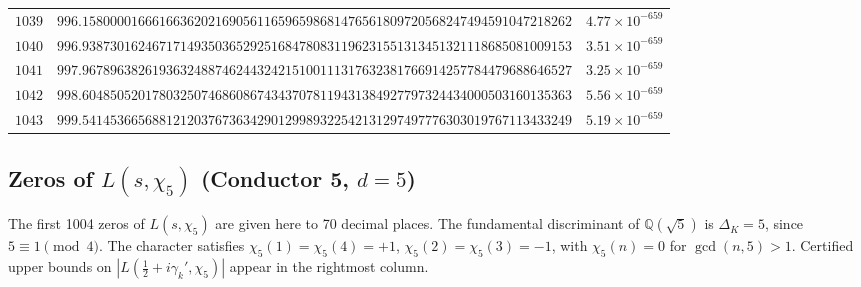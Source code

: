 \documentclass[12pt,reqno]{amsart}
\theoremstyle{remark}
\newcommand{\Q}{\mathbb{Q}}
\begin{document}
\begin{longtable}{clc}
$1039$ & $996.1580000166616636202169056116596598681476561809720568247494591047218262$ & $4.77\times 10^{-659}$ \\
$1040$ & $996.9387301624671714935036529251684780831196231551313451321118685081009153$ & $3.51\times 10^{-659}$ \\
$1041$ & $997.9678963826193632488746244324215100111317632381766914257784479688646527$ & $3.25\times 10^{-659}$ \\
$1042$ & $998.6048505201780325074686086743437078119431384927797324434000503160135363$ & $5.56\times 10^{-659}$ \\
$1043$ & $999.5414536656881212037673634290129989322542131297497776303019767113433249$ & $5.19\times 10^{-659}$ \\
\end{longtable}
\normalsize
\setlength{\LTleft}{0pt}
\setlength{\LTright}{0pt}

\subsection{Zeros of \texorpdfstring{$L(s,\chi_5)$}{L(s,chi5)} (Conductor 5, \texorpdfstring{$d = 5$}{d=5})}
\label{subsec:chi5}

The first 1004 zeros of $L(s,\chi_5)$ are given here to 70 decimal places.  The fundamental discriminant of $\Q(\sqrt{5})$ is $\Delta_K = 5$, since $5 \equiv 1 \pmod{4}$.  The character satisfies $\chi_5(1) = \chi_5(4) = +1$, $\chi_5(2) = \chi_5(3) = -1$, with $\chi_5(n) = 0$ for $\gcd(n,5) > 1$.  Certified upper bounds on $|L(\tfrac{1}{2}+i\gamma_k',\chi_5)|$ appear in the rightmost column.
\end{document}
